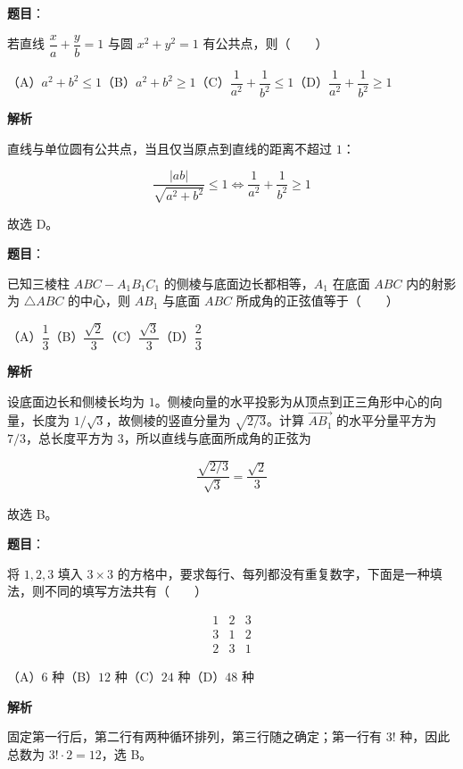 \begin{answer}

\textbf{题目}：

若直线 $\dfrac{x}{a}+\dfrac{y}{b}=1$ 与圆 $x^2+y^2=1$ 有公共点，则\mbox{（　　）}

（A）$a^2+b^2\leqslant1$\quad（B）$a^2+b^2\geqslant1$\quad（C）$\dfrac1{a^2}+\dfrac1{b^2}\leqslant1$\quad（D）$\dfrac1{a^2}+\dfrac1{b^2}\geqslant1$

\textbf{解析}

直线与单位圆有公共点，当且仅当原点到直线的距离不超过 $1$：

\nopagebreak[4]
\[
\frac{|ab|}{\sqrt{a^2+b^2}}\leqslant1
\Longleftrightarrow \frac1{a^2}+\frac1{b^2}\geqslant1
\]

故选 D。


\end{answer}
\begin{answer}

\textbf{题目}：

已知三棱柱 $ABC-A_1B_1C_1$ 的侧棱与底面边长都相等，$A_1$ 在底面 $ABC$ 内的射影为 $\triangle ABC$ 的中心，则 $AB_1$ 与底面 $ABC$ 所成角的正弦值等于\mbox{（　　）}

（A）$\dfrac13$\quad（B）$\dfrac{\sqrt2}{3}$\quad（C）$\dfrac{\sqrt3}{3}$\quad（D）$\dfrac23$

\textbf{解析}

设底面边长和侧棱长均为 $1$。侧棱向量的水平投影为从顶点到正三角形中心的向量，长度为 $1/\sqrt3$，故侧棱的竖直分量为 $\sqrt{2/3}$。计算 $\overrightarrow{AB_1}$ 的水平分量平方为 $7/3$，总长度平方为 $3$，所以直线与底面所成角的正弦为

\nopagebreak[4]
\[
\frac{\sqrt{2/3}}{\sqrt3}=\frac{\sqrt2}{3}
\]

故选 B。


\end{answer}
\begin{answer}

\textbf{题目}：

将 $1,2,3$ 填入 $3\times3$ 的方格中，要求每行、每列都没有重复数字，下面是一种填法，则不同的填写方法共有\mbox{（　　）}

\nopagebreak[4]
\[
\begin{matrix}1&2&3\\3&1&2\\2&3&1\end{matrix}
\]

（A）$6$ 种\quad（B）$12$ 种\quad（C）$24$ 种\quad（D）$48$ 种

\textbf{解析}

固定第一行后，第二行有两种循环排列，第三行随之确定；第一行有 $3!$ 种，因此总数为 $3!\cdot2=12$，选 B。


\end{answer}
